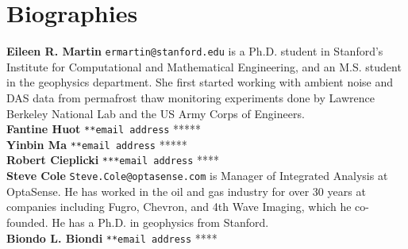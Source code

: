 \documentclass[11pt]{article}
\begin{document}


\section*{Biographies}
\textbf{Eileen R. Martin} \texttt{ermartin@stanford.edu} is a Ph.D. student in Stanford's Institute for Computational and Mathematical Engineering, and an M.S. student in the geophysics department. She first started working with ambient noise and DAS data from permafrost thaw monitoring experiments done by Lawrence Berkeley National Lab and the US Army Corps of Engineers.
\\
\textbf{Fantine Huot} \texttt{**email address} *****
\\
\textbf{Yinbin Ma} \texttt{**email address} *****
\\
\textbf{Robert Cieplicki} \texttt{***email address} ****
\\
\textbf{Steve Cole} \texttt{Steve.Cole@optasense.com} is Manager of Integrated Analysis at OptaSense. He has worked in the oil and gas industry for over 30 years at companies including Fugro, Chevron, and 4th Wave Imaging, which he co-founded. He has a Ph.D. in geophysics from Stanford.
\\
\textbf{Biondo L. Biondi} \texttt{**email address} ****
\end{document}
